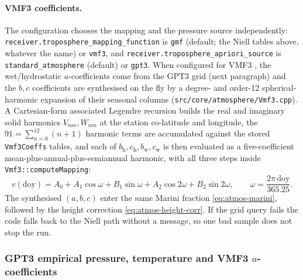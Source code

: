 \documentclass[main.tex]{subfiles}
\begin{document}
\paragraph{VMF3 coefficients.}
The configuration chooses the mapping and the pressure source
independently: \texttt{receiver.troposphere\_mapping\_function} is
\texttt{gmf} (default; the Niell tables above, whatever the name) or
\texttt{vmf3}, and \texttt{receiver.troposphere\_apriori\_source} is
\texttt{standard\_atmosphere} (default) or \texttt{gpt3}.  When configured
for VMF3 \cite{landskron2018vmf3}, the wet/hydrostatic
$a$-coefficients come from the GPT3 grid (next paragraph) and the $b,c$
coefficients are synthesised on the fly by a degree- and order-12
spherical-harmonic expansion of their seasonal columns
(\texttt{src/core/atmosphere/Vmf3.cpp}).  A Cartesian-form associated
Legendre recursion builds the real and imaginary solid harmonics
$V_{nm},W_{nm}$ at the station co-latitude and longitude, the
$91 = \sum_{n=0}^{12}(n+1)$ harmonic terms are accumulated against the
stored \texttt{Vmf3Coeffs} tables, and each of $b_{\mathrm h},c_{\mathrm
h},b_{\mathrm w},c_{\mathrm w}$ is then evaluated as a five-coefficient
mean-plus-annual-plus-semiannual harmonic, with all three steps inside
\texttt{Vmf3::computeMapping}:
\begin{equation}
v(\mathrm{doy}) = A_0 + A_1\cos\omega + B_1\sin\omega
                       + A_2\cos 2\omega + B_2\sin 2\omega,
\qquad \omega = \frac{2\pi\,\mathrm{doy}}{365.25}.
\label{eq:atmos-seasonal-harmonic}
\end{equation}
The synthesised $(a,b,c)$ enter the same Marini fraction
\eqref{eq:atmos-marini}, followed by the height correction
\eqref{eq:atmos-height-corr}.  If the grid query fails the code falls
back to the Niell path without a message, so one bad sample does not
stop the run.

\subsubsection{GPT3 empirical pressure, temperature and VMF3 $a$-coefficients}
\end{document}

